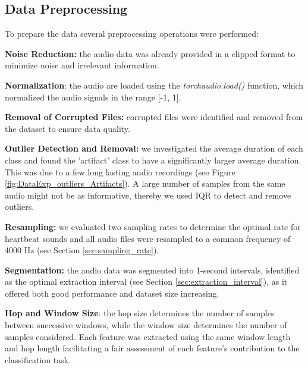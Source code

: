 \subsection{Data Preprocessing}
To prepare the data several preprocessing operations were performed:

\vspace{0.2cm}\noindent
\textbf{Noise Reduction:} the audio data was already provided in a clipped format 
to minimize noise and irrelevant information.

\vspace{0.2cm}\noindent
\textbf{Normalization}: the audio are loaded using the \textit{torchaudio.load()} 
function, which normalized the audio signals in the range [-1, 1]. 

\vspace{0.2cm}\noindent
\textbf{Removal of Corrupted Files:} corrupted files were identified and removed 
from the dataset to ensure data quality.

\vspace{0.2cm}\noindent
\textbf{Outlier Detection and Removal:} we investigated the average duration of 
each class and found the 'artifact' class to have a significantly larger average 
duration. This was due to a few long lasting audio 
recordings (see Figure \ref{fig:DataExp_outliers_Artifacts}). A large number of samples from 
the same audio might not be as informative, thereby we used IQR to detect and remove outliers.

\vspace{0.2cm}\noindent
\textbf{Resampling:} we evaluated two sampling rates to determine the optimal rate 
for heartbeat sounds and all audio files were resampled to a common frequency of 4000 Hz 
(see Section \ref{sec:sampling_rate}).

\vspace{0.2cm}\noindent
\textbf{Segmentation:} the audio data was segmented into 1-second intervals, 
identified as the optimal extraction interval (see Section \ref{sec:extraction_interval}), as
it offered both good performance and dataset size increasing.

\vspace{0.2cm}\noindent
\textbf{Hop and Window Size}: the hop size determines the number of samples between 
successive windows, while the window size determines the number of samples considered. 
Each feature was extracted using the same window length and hop length facilitating a 
fair assessment of each feature's contribution to the classification task. 

